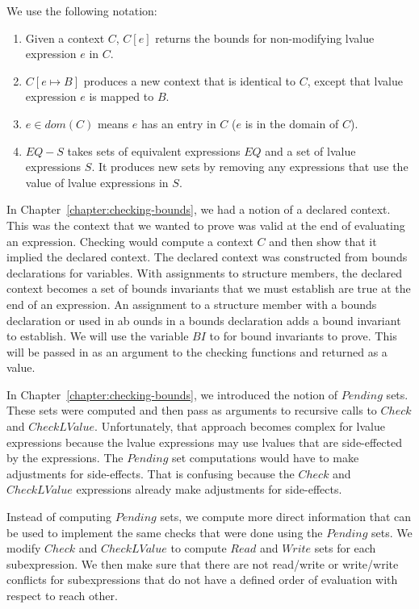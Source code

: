 We use the following notation:
\begin{enumerate}
\item Given a context $C$, $C[e]$ returns the bounds for non-modifying lvalue expression $e$ in $C$.
\item $C[e \mapsto B]$ produces a new context that is identical to $C$,
except that lvalue expression  $e$ is mapped to $B$.
\item $e \in dom(C)$ means $e$ has an entry in $C$ ($e$ is in the domain of $C$).
\item $EQ - S$ takes sets of equivalent expressions $EQ$  and a set of lvalue expressions
$S$.  It produces new sets by removing any expressions that use the value 
of lvalue expressions in $S$.
\end{enumerate}

In Chapter~\ref{chapter:checking-bounds}, we had a notion of a declared context.  This
was the context that we wanted to prove was valid at the end of evaluating an expression.
Checking would compute a context $C$ and then show that it implied the declared context. 
The declared context was constructed from bounds declarations for variables.  With assignments to 
structure members, the declared context becomes a set of bounds invariants that we must
establish are true at the end of an expression.  An assignment to a structure member with
a bounds declaration or used in ab ounds in a bounds declaration adds a bound
invariant to establish.  We will use the variable $BI$ to for bound invariants
to prove.  This will be passed in as an argument to the checking functions and
returned as a value.

In Chapter~\ref{chapter:checking-bounds}, we introduced the notion of $Pending$ sets.
These sets were computed and then pass as arguments to recursive calls to $Check$
and $CheckLValue$.  Unfortunately, that approach becomes complex for lvalue expressions
because the lvalue expressions may use lvalues that are side-effected by the expressions.
The $Pending$ set computations would have to make adjustments for side-effects.  That
is confusing because the $Check$ and $CheckLValue$ expressions already make adjustments
for side-effects.

Instead of computing $Pending$ sets, we compute more direct information that can be
used to implement the same checks that were done using the $Pending$ sets.  We
modify $Check$ and $CheckLValue$ to compute $Read$ and $Write$ sets for each
subexpression.  We then make sure that there are not read/write or write/write
conflicts for subexpressions that do not have a defined order of evaluation with
respect to reach other.


